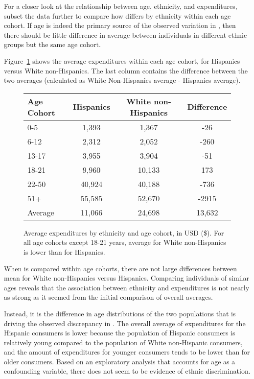 For a closer look at the relationship between age, ethnicity, and expenditures, subset the data further to compare how  differs by ethnicity within each age cohort. If age is indeed the primary source of the observed variation in , then there should be little difference in average  between individuals in different ethnic groups but the same age cohort. 

Figure~\ref{ddsAvgExpEthAge} shows the average expenditures within each age cohort, for Hispanics versus White non-Hispanics. The last column contains the difference between the two averages (calculated as White Non-Hispanics average - Hispanics average).

\begin{figure}[ht]
	\centering
	\begin{tabular}{|l|c|c|c|}
		\hline
		Age Cohort & Hispanics & White non-Hispanics & Difference \\ 
		\hline
		0-5 & 1,393 & 1,367 & -26 \\ 
		6-12 & 2,312 & 2,052 & -260 \\ 
		13-17 & 3,955 & 3,904 & -51 \\ 
		\cellcolor{lightblue} 18-21 & \cellcolor{lightblue} 9,960 & \cellcolor{lightblue} 10,133 & \cellcolor{lightblue} 173 \\ 
		22-50 & 40,924 & 40,188 & -736 \\ 
		51+ & 55,585 & 52,670 & -2915 \\ 
		\hline
		Average & 11,066 & 24,698 & 13,632\\
		\hline
	\end{tabular}
	\caption{Average expenditures by ethnicity and age cohort, in USD (\$). For all age cohorts except 18-21 years, average  for White non-Hispanics is lower than for Hispanics.}
	\label{ddsAvgExpEthAge}
\end{figure}

When  is compared within age cohorts, there are not large differences between mean  for White non-Hispanics versus Hispanics. Comparing individuals of similar ages reveals that the association between ethnicity and expenditures is not nearly as strong as it seemed from the initial comparison of overall averages. 

\textD{\newpage}

Instead, it is the difference in age distributions of the two populations that is driving the observed discrepancy in . The overall average of expenditures for the Hispanic consumers is lower because the population of Hispanic consumers is relatively young compared to the population of White non-Hispanic consumers, and the amount of expenditures for younger consumers tends to be lower than for older consumers. Based on an exploratory analysis that accounts for age as a confounding variable, there does not seem to be evidence of ethnic discrimination. 

